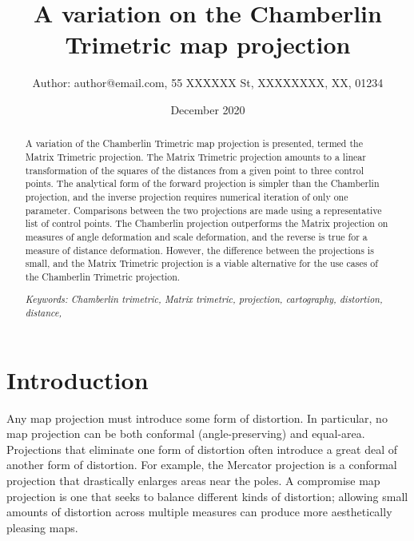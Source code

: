 \documentclass[]{interact}
\title{A variation on the Chamberlin Trimetric map projection}
\author{Author: author@email.com, 55 XXXXXX St, XXXXXXXX, XX, 01234}
\date{December 2020}
\begin{document}
\maketitle
\begin{abstract}%
   A variation of the Chamberlin Trimetric map projection is presented,
   termed the Matrix Trimetric projection. The Matrix Trimetric projection
   amounts to a linear transformation of the squares of the distances from a
   given point to three control points. The analytical form of the forward
   projection is simpler than the Chamberlin projection, and the inverse
   projection requires numerical iteration of only one parameter. Comparisons
   between the two projections are made using a representative list of control
   points. The Chamberlin projection outperforms the Matrix projection on
   measures of angle deformation and scale deformation, and the reverse is true
   for a measure of distance deformation. However, the difference between the
   projections is small, and the Matrix Trimetric projection is a viable
   alternative for the use cases of the Chamberlin Trimetric projection.

   \textit{Keywords: Chamberlin trimetric, Matrix trimetric, projection,
   cartography, distortion, distance, }

\end{abstract}

\section{Introduction}
Any map projection must introduce some form of distortion. In particular, no
map projection can be both conformal (angle-preserving) and equal-area.
Projections that eliminate one form of distortion often introduce a great deal
of another form of distortion. For example, the Mercator projection is a
conformal projection that drastically enlarges areas near the poles.
\citep{snyder87} A compromise map projection is one that seeks to
balance different kinds of distortion; allowing small amounts of distortion
across multiple measures can produce more aesthetically pleasing maps.
\end{document}
